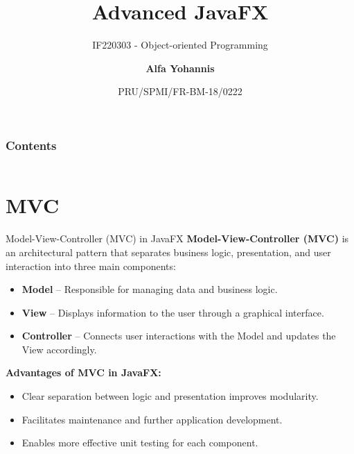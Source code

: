 \documentclass[aspectratio=169, table]{beamer}
\subtitle{IF220303 - Object-oriented Programming}
\title{\Huge Advanced JavaFX\\\vspace{20pt}}
\date[Serial]{\scriptsize {PRU/SPMI/FR-BM-18/0222}}
\author[Pradita]{\small {\textbf{Alfa Yohannis}}}
\begin{document}
\frame{\titlepage}

\begin{frame}[fragile]
\frametitle{Contents}
\vspace{10pt}
\begin{columns}[t]
	\tableofcontents[sections={1-5}]
	
	\tableofcontents[sections={6-10}]
\end{columns}
\end{frame}

\section{MVC}
\begin{frame}{Model-View-Controller (MVC) in JavaFX}
\vspace{20pt}
\textbf{Model-View-Controller (MVC)} is an architectural pattern that separates business logic, presentation, and user interaction into three main components:
\begin{itemize}
	\item \textbf{Model} – Responsible for managing data and business logic.
	\item \textbf{View} – Displays information to the user through a graphical interface.
	\item \textbf{Controller} – Connects user interactions with the Model and updates the View accordingly.
\end{itemize}
\vspace{10pt}
\textbf{Advantages of MVC in JavaFX:}
\begin{itemize}
	\item Clear separation between logic and presentation improves modularity.
	\item Facilitates maintenance and further application development.
	\item Enables more effective unit testing for each component.
\end{itemize}
\end{frame}
\end{document}
